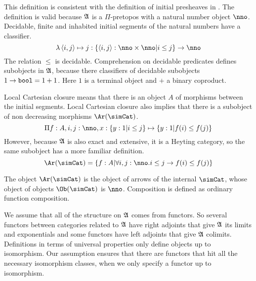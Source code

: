 \documentclass[csh.tex]{subfiles}
\begin{document}
This definition is consistent with the definition of initial presheaves in \citep{MR1300636}. The definition is valid because $\mathfrak A$ is a $\Pi$-pretopos with a natural number object $\nno$. Decidable, finite and inhabited initial segments of the natural numbers have a classifier.
\[  \function{\tuplet{i,j}}j\of\set{\tuplet{i,j}\of\nno\times\nno\middle|i\leq j}\to \nno \]
The relation $\leq$ is decidable. Comprehension on decidable predicates defines subobjects in $\mathfrak A$, because there classifiers of decidable subobjects $1\to \mathtt{bool} = 1+1$. Here $1$ is a terminal object and $+$ a binary coproduct.

Local Cartesian closure means that there is an object $A$ of morphisms between the initial segments. Local Cartesian closure also implies that there is a subobject of non decreasing morphisms $\Ar(\simCat)$.
\[ \product{f\of A,i,j\of\nno,x\of\set{y\of 1|i\leq j}}{\set{y\of 1|f(i)\leq f(j)}}\]
However, because $\mathfrak A$ is also exact and extensive, it is a Heyting category, so the same subobject has a more familiar definition.
\[ \Ar(\simCat)=\set{f\of A|\forall i,j\of\nno.i\leq j \to f(i)\leq f(j)} \]

\begin{definition} The object $\Ar(\simCat)$ is the object of arrows of the internal  $\simCat$, whose object of objects $\Ob(\simCat)$ is $\nno$. Composition is defined as ordinary function composition.
\end{definition}

\begin{remark} We assume that all of the structure on $\mathfrak A$ comes from functors. So several functors between categories related to $\mathfrak A$ have right adjoints that give $\mathfrak A$ its limits and exponentials and some functors have left adjoints that give $\mathfrak A$ colimits. Definitions in terms of universal properties only define objects up to isomorphism. Our assumption ensures that there are functors that hit all the necessary isomorphism classes, when we only specify a functor up to isomorphism.
\end{remark}
\end{document}
